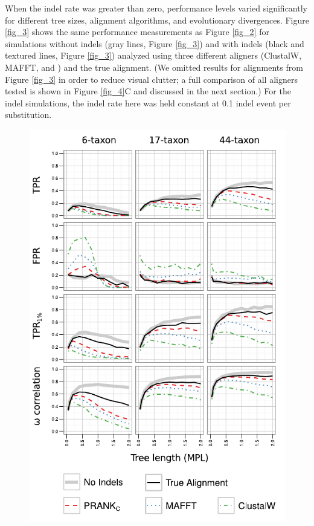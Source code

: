 \documentclass{article}
\begin{document}
When the indel rate was greater than zero, performance levels varied
significantly for different tree sizes, alignment algorithms, and
evolutionary divergences. Figure \ref{fig_3} shows the same
performance measurements as Figure \ref{fig_2} for simulations without
indels (gray lines, Figure \ref{fig_3}) and with indels (black and
textured lines, Figure \ref{fig_3}) analyzed using three different
aligners (ClustalW, MAFFT, and \prankc) and the true alignment. (We
omitted results for \pranka alignments from Figure \ref{fig_3} in
order to reduce visual clutter; a full comparison of all aligners
tested is shown in Figure \ref{fig_4}C and discussed in the next
section.) For the indel simulations, the indel rate here was held
constant at 0.1 indel event per substitution.
\begin{figure}[t]
\begin{center}
\includegraphics[scale=1.25]{fig3.pdf}

\end{center}
\end{figure}
\end{document}
